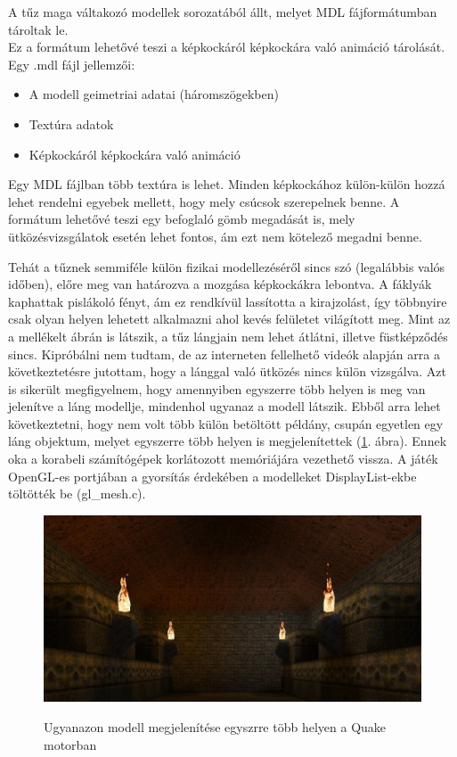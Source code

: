 A tűz maga váltakozó modellek sorozatából állt, melyet MDL fájformátumban tároltak le.\\
 Ez a formátum lehetővé teszi a képkockáról képkockára való animáció tárolását. Egy .mdl fájl jellemzői: 
\begin{itemize} 
\item A modell geimetriai adatai (háromszögekben)
\item Textúra adatok
\item Képkockáról képkockára való animáció
\end{itemize} 
Egy MDL fájlban több textúra is lehet. Minden képkockához külön-külön hozzá lehet rendelni egyebek mellett, hogy mely csúcsok szerepelnek benne. A formátum lehetővé teszi egy befoglaló gömb megadását is, mely ütközésvizsgálatok esetén lehet fontos, ám ezt nem kötelező megadni benne.  \cite{MDLformat} 
 
Tehát a tűznek semmiféle külön fizikai modellezéséről sincs szó (legalábbis valós időben), előre meg van határozva a mozgása képkockákra lebontva. A fáklyák kaphattak pislákoló fényt, ám ez rendkívül lassította a kirajzolást, így többnyire csak olyan helyen lehetett alkalmazni ahol kevés felületet világított meg. Mint az a mellékelt ábrán is látszik, a tűz lángjain nem lehet átlátni, illetve füstképződés sincs. Kipróbálni nem tudtam, de az interneten fellelhető videók alapján arra a következtetésre jutottam, hogy a lánggal való ütközés nincs külön vizsgálva. Azt is sikerült megfigyelnem, hogy amennyiben egyszerre több helyen is meg van jelenítve a láng modellje, mindenhol ugyanaz a modell látszik. Ebből arra lehet következtetni, hogy nem volt több külön betöltött példány, csupán egyetlen egy láng objektum, melyet egyszerre több helyen is megjelenítettek (\ref{fig:quakeTorch}. ábra). Ennek oka a korabeli számítógépek korlátozott memóriájára vezethető vissza. A játék OpenGL-es portjában a gyorsítás érdekében a modelleket DisplayList-ekbe töltötték be (gl\_mesh.c).

\begin{figure}[h]
 \caption{Ugyanazon modell megjelenítése egyszrre több helyen a Quake motorban}
 \includegraphics[width=\textwidth]{kepek/quake_torches2.jpg}
 \label{fig:quakeTorch}
\end{figure}

